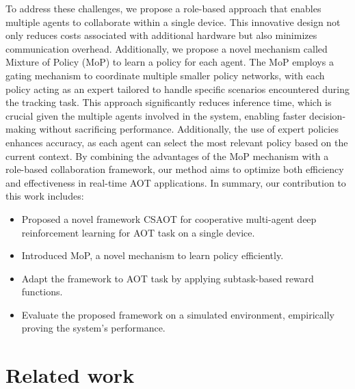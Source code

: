 \documentclass[sigconf]{aamas}
\begin{document}
To address these challenges, we propose a role-based approach that enables multiple agents to collaborate within a single device. This innovative design not only reduces costs associated with additional hardware but also minimizes communication overhead. Additionally, we propose a novel mechanism called Mixture of Policy (MoP) to learn a policy for each agent. The MoP employs a gating mechanism to coordinate multiple smaller policy networks, with each policy acting as an expert tailored to handle specific scenarios encountered during the tracking task. This approach significantly reduces inference time, which is crucial given the multiple agents involved in the system, enabling faster decision-making without sacrificing performance. Additionally, the use of expert policies enhances accuracy, as each agent can select the most relevant policy based on the current context. By combining the advantages of the MoP mechanism with a role-based collaboration framework, our method aims to optimize both efficiency and effectiveness in real-time AOT applications. In summary, our contribution to this work includes:
\begin{itemize}
    \item Proposed a novel framework CSAOT for cooperative multi-agent deep reinforcement learning for AOT task on a single device.
    \item Introduced MoP, a novel mechanism to learn policy efficiently.
    \item Adapt the framework to AOT task by applying subtask-based reward functions.
    \item Evaluate the proposed framework on a simulated environment, empirically proving the system's performance.
\end{itemize}


\section{Related work}
\end{document}
